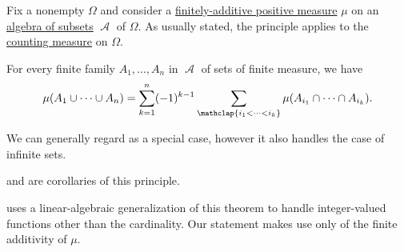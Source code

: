 \begin{theorem}\label{thm:inclusion_exclusion_principle}
  Fix a nonempty \( \Omega \) and consider a \hyperref[def:measure/positive]{finitely-additive positive measure} \( \mu \) on an \hyperref[def:algebra_of_subsets]{algebra of subsets} \( \mscrA \) of \( \Omega \). As usually stated, the principle applies to the \hyperref[def:counting_measure]{counting measure} on \( \Omega \).

  For every finite family \( A_1, \ldots, A_n \) in \( \mscrA \) of sets of finite measure, we have
  \begin{equation}\label{eq:thm:inclusion_exclusion_principle}
    \mu(A_1 \cup \cdots \cup A_n) = \sum_{k=1}^n (-1)^{k - 1} \sum_{\mathclap{i_1 < \cdots < i_k}} \mu(A_{i_1} \cap \cdots \cap A_{i_k}).
  \end{equation}
\end{theorem}
\begin{comments}
  \item We can generally regard  as a special case, however it also handles the case of infinite sets.

  \item {} and  are corollaries of this principle.

  \item \Textcite*[195]{Stanley2012EnumerativeCombinatoricsVol1} uses a linear-algebraic generalization of this theorem to handle integer-valued functions other than the cardinality. Our statement makes use only of the finite additivity of \( \mu \).
\end{comments}
